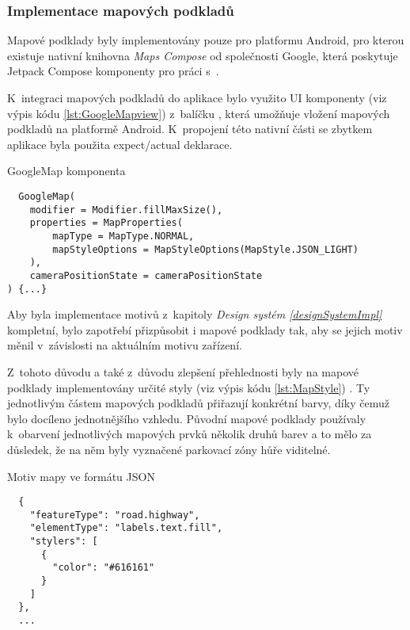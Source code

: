\subsubsection*{Implementace mapových podkladů}
Mapové podklady byly implementovány pouze pro platformu Android, pro kterou existuje nativní knihovna \textit{Maps Compose} od společnosti Google, 
která poskytuje Jetpack Compose komponenty pro práci s~.

K~integraci mapových podkladů do aplikace bylo využito UI komponenty  (viz výpis kódu \ref{lst:GoogleMapview}) z~balíčku 
, která umožňuje vložení mapových podkladů na platformě Android. K~propojení této nativní části 
se zbytkem aplikace byla použita expect/actual deklarace.


\begin{listing}[H]
\caption{GoogleMap komponenta}\label{lst:GoogleMapview}
\begin{verbatim}
  GoogleMap(
    modifier = Modifier.fillMaxSize(),
    properties = MapProperties(
        mapType = MapType.NORMAL,
        mapStyleOptions = MapStyleOptions(MapStyle.JSON_LIGHT)
    ),
    cameraPositionState = cameraPositionState
) {...}
\end{verbatim}
\end{listing}


Aby byla implementace motivů z~kapitoly \textit{Design systém \ref{designSystemImpl}} kompletní, bylo zapotřebí přizpůsobit i mapové podklady tak,
aby se jejich motiv měnil v~závislosti na aktuálním motivu zařízení.

Z~tohoto důvodu a také z~důvodu zlepšení přehlednosti byly na mapové podklady implementovány určité styly (viz výpis kódu \ref{lst:MapStyle}) \cite{googleStyles}.
Ty jednotlivým částem mapových podkladů přiřazují konkrétní barvy, díky čemuž bylo docíleno jednotnějšího vzhledu. Původní mapové podklady
používaly k~obarvení jednotlivých mapových prvků několik druhů barev a to mělo za důsledek, že na něm byly vyznačené parkovací zóny hůře viditelné.

\begin{listing}[H]
\caption{Motiv mapy ve formátu JSON}\label{lst:MapStyle}
\begin{verbatim}
  {
    "featureType": "road.highway",
    "elementType": "labels.text.fill",
    "stylers": [
      {
        "color": "#616161"
      }
    ]
  },
  ...
\end{verbatim}
\end{listing}

